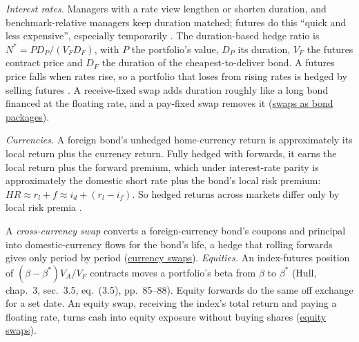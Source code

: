 \begin{qfmethod}\label{meth:forward-commitment-risk-overlays}
 \emph{Interest rates.} Managers with a rate view lengthen or shorten duration, and benchmark-relative managers keep duration matched; futures do this ``quick and less expensive'', especially temporarily \citep[chap.~62, pp.~1533--1534]{s7-fabozzifixed}. The duration-based hedge ratio is $N^*=PD_P/(V_FD_F)$, with $P$ the portfolio's value, $D_P$ its duration, $V_F$ the futures contract price and $D_F$ the duration of the cheapest-to-deliver bond. A futures price falls when rates rise, so a portfolio that loses from rising rates is hedged by selling futures \citep[chap.~6, sec.~6.4, pp.~166--167]{s7-hulloptions}. A receive-fixed swap adds duration roughly like a long bond financed at the floating rate, and a pay-fixed swap removes it (\hyperref[def:swaps-as-forward-strips]{swaps as bond packages}).

\emph{Currencies.} A foreign bond's unhedged home-currency return is approximately its local return plus the currency return. Fully hedged with forwards, it earns the local return plus the forward premium, which under interest-rate parity is approximately the domestic short rate plus the bond's local risk premium: $HR\approx r_l+f\approx i_d+(r_l-i_f)$. So hedged returns across markets differ only by local risk premia \citep[chap.~6, sec.~6.2, pp.~393--396]{managing-investment-portfolios-2007}.

A \emph{cross-currency swap} converts a foreign-currency bond's coupons and principal into domestic-currency flows for the bond's life, a hedge that rolling forwards gives only period by period (\hyperref[meth:swap-valuation-replication]{currency swaps}). \emph{Equities.} An index-futures position of $(\beta-\beta^*)V_A/V_F$ contracts moves a portfolio's beta from $\beta$ to $\beta^*$ (Hull, chap.~3, sec.~3.5, eq.~(3.5), pp.~85--88). Equity forwards do the same off exchange for a set date. An equity swap, receiving the index's total return and paying a floating rate, turns cash into equity exposure without buying shares (\hyperref[meth:swap-valuation-replication]{equity swaps}).


\end{qfmethod}

